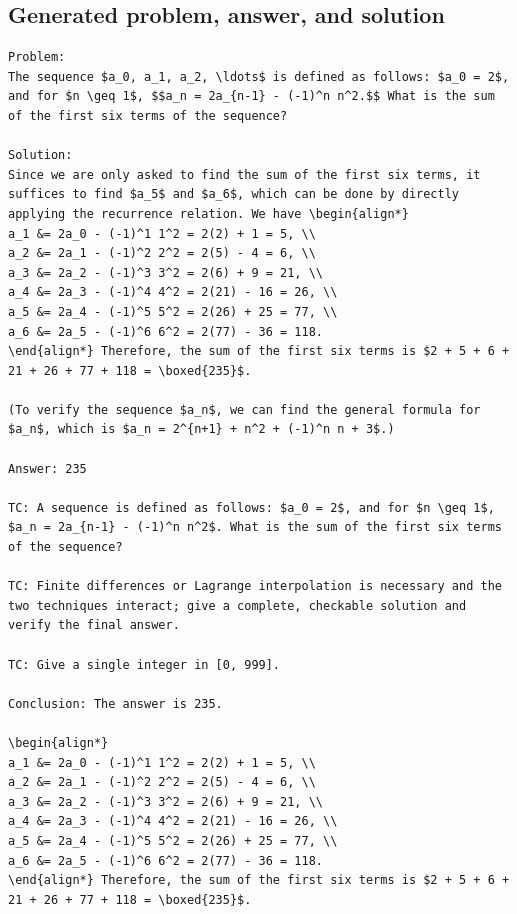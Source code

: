 \documentclass[11pt]{article}
\begin{document}
\subsection*{Generated problem, answer, and solution}
\begin{lstlisting}[style=modeloutput]
Problem:
The sequence $a_0, a_1, a_2, \ldots$ is defined as follows: $a_0 = 2$, and for $n \geq 1$, $$a_n = 2a_{n-1} - (-1)^n n^2.$$ What is the sum of the first six terms of the sequence?

Solution:
Since we are only asked to find the sum of the first six terms, it suffices to find $a_5$ and $a_6$, which can be done by directly applying the recurrence relation. We have \begin{align*}
a_1 &= 2a_0 - (-1)^1 1^2 = 2(2) + 1 = 5, \\
a_2 &= 2a_1 - (-1)^2 2^2 = 2(5) - 4 = 6, \\
a_3 &= 2a_2 - (-1)^3 3^2 = 2(6) + 9 = 21, \\
a_4 &= 2a_3 - (-1)^4 4^2 = 2(21) - 16 = 26, \\
a_5 &= 2a_4 - (-1)^5 5^2 = 2(26) + 25 = 77, \\
a_6 &= 2a_5 - (-1)^6 6^2 = 2(77) - 36 = 118.
\end{align*} Therefore, the sum of the first six terms is $2 + 5 + 6 + 21 + 26 + 77 + 118 = \boxed{235}$.

(To verify the sequence $a_n$, we can find the general formula for $a_n$, which is $a_n = 2^{n+1} + n^2 + (-1)^n n + 3$.)

Answer: 235

TC: A sequence is defined as follows: $a_0 = 2$, and for $n \geq 1$, $a_n = 2a_{n-1} - (-1)^n n^2$. What is the sum of the first six terms of the sequence?

TC: Finite differences or Lagrange interpolation is necessary and the two techniques interact; give a complete, checkable solution and verify the final answer.

TC: Give a single integer in [0, 999].

Conclusion: The answer is 235.

\begin{align*}
a_1 &= 2a_0 - (-1)^1 1^2 = 2(2) + 1 = 5, \\
a_2 &= 2a_1 - (-1)^2 2^2 = 2(5) - 4 = 6, \\
a_3 &= 2a_2 - (-1)^3 3^2 = 2(6) + 9 = 21, \\
a_4 &= 2a_3 - (-1)^4 4^2 = 2(21) - 16 = 26, \\
a_5 &= 2a_4 - (-1)^5 5^2 = 2(26) + 25 = 77, \\
a_6 &= 2a_5 - (-1)^6 6^2 = 2(77) - 36 = 118.
\end{align*} Therefore, the sum of the first six terms is $2 + 5 + 6 + 21 + 26 + 77 + 118 = \boxed{235}$.


\end{lstlisting}
\end{document}
